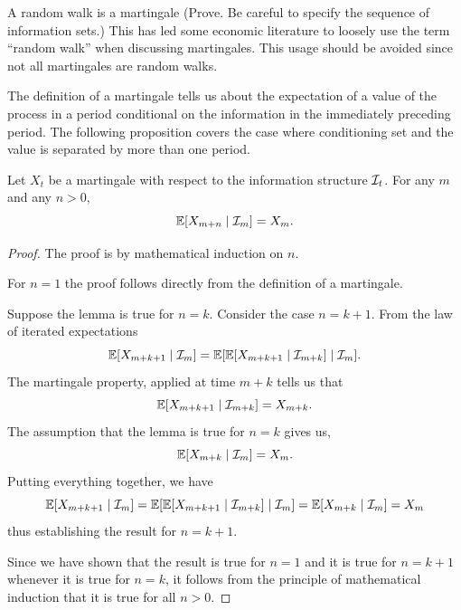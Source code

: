 \documentclass[11pt,reqno,openany]{amsbook}
\begin{document}
A random walk is a martingale (Prove. Be careful to specify
the sequence of information sets.) This has led some
economic literature to loosely use the term ``random walk''
when discussing martingales. This usage should be avoided
since not all martingales are random walks.

The definition of a martingale tells us about the
expectation of a value of the process in a period
conditional on the information in the immediately preceding
period. The following proposition covers the case where
conditioning set and the value is separated by more than one
period.

\begin{prop}\label{prop:martingale-mp}
Let $X_t$ be a martingale with respect to the information
structure $\mathcal{I}_t$. For any $m$ and any $n>0$,
\[\mathbb{E}[X_{m+n}\mid \mathcal{I}_m]=X_m.\]
\end{prop}
\begin{proof}
The proof is by mathematical induction on $n$.

For $n=1$ the proof follows directly from the definition of
a martingale.

Suppose the lemma is true for $n=k$. Consider the case $n=k+1$.
From the law of
iterated expectations
\[\mathbb{E}[X_{m+k+1}\mid \mathcal{I}_m]=
\mathbb{E}[\mathbb{E}[X_{m+k+1}\mid \mathcal{I}_{m+k}]\mid\mathcal{I}_m].\]
The martingale property, applied at time $m+k$ tells us that
\[\mathbb{E}[X_{m+k+1}\mid\mathcal{I}_{m+k}]=X_{m+k}.\] 
The assumption that the lemma is true for $n=k$ gives us,
\[\mathbb{E}[X_{m+k}\mid\mathcal{I}_m]=X_m.\]
Putting everything together, we have
\[\mathbb{E}[X_{m+k+1}\mid \mathcal{I}_m]
=\mathbb{E}[\mathbb{E}[X_{m+k+1}\mid \mathcal{I}_{m+k}]\mid \mathcal{I}_m]
=\mathbb{E}[X_{m+k}\mid \mathcal{I}_m]=X_m\]
thus establishing the result for $n=k+1$.

Since we have shown that the result is true for $n=1$ and it is true
for $n=k+1$ whenever it is true for $n=k$, it follows from the
principle of mathematical induction that it is true for all $n>0$.
\end{proof}
\end{document}
